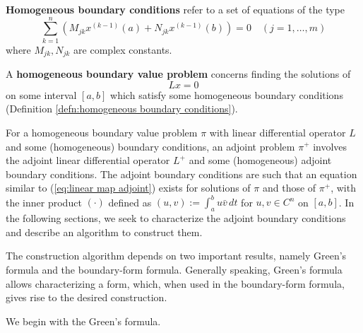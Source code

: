 \documentclass[11pt, oneside, a4paper]{article}
\begin{document}
\begin{defn}\cite[p.284]{CoddingtonLevinson}\label{defn:homogeneous boundary conditions}
    \textbf{Homogeneous boundary conditions} refer to a set of equations of the type
    \begin{equation}\label{eq:homogeneous boundary conditions}
        \sum_{k=1}^n (M_{jk}x^{(k-1)}(a) + N_{jk}x^{(k-1)}(b))=0 \quad (j=1,\ldots,m) 
    \end{equation}
    where $M_{jk}, N_{jk}$ are complex constants.
\end{defn}

\begin{defn}\cite[p.284]{CoddingtonLevinson}\label{defn:homogeneous boundary value problem}
    A \textbf{homogeneous boundary value problem} concerns finding the solutions of 
    \[Lx=0\] on some interval $[a,b]$ which satisfy some homogeneous boundary conditions (Definition \ref{defn:homogeneous boundary conditions}).
\end{defn}

For a homogeneous boundary value problem $\pi$ with linear differential operator $L$ and some (homogeneous) boundary conditions, an adjoint problem $\pi^+$ involves the adjoint linear differential operator $L^+$ and some (homogeneous) adjoint boundary conditions. The adjoint boundary conditions are such that an equation similar to (\ref{eq:linear map adjoint}) exists for solutions of $\pi$ and those of $\pi^+$, with the inner product $(\cdot)$ defined as $(u,v) := \int_a^b u\bar{v}\,dt$ for $u, v\in C^n$ on $[a,b]$. In the following sections, we seek to characterize the adjoint boundary conditions and describe an algorithm to construct them.

The construction algorithm depends on two important results, namely Green's formula and the boundary-form formula. Generally speaking, Green's formula allows characterizing a form, which, when used in the boundary-form formula, gives rise to the desired construction. 

We begin with the Green's formula.
\end{document}
